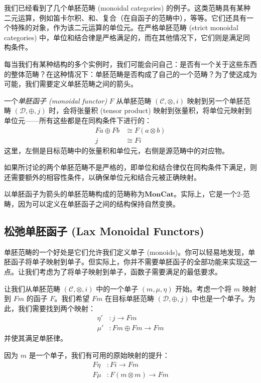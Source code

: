 \documentclass[DaoFP]{subfiles}
\begin{document}
    我们已经看到了几个单胚范畴 (monoidal categories) 的例子。这类范畴具有某种二元运算，例如笛卡尔积、和、复合（在自函子的范畴中），等等。它们还具有一个特殊的对象，作为该二元运算的单位元。在严格单胚范畴 (strict monoidal categories) 中，单位和结合律是严格满足的，而在其他情况下，它们则是满足同构条件。

    每当我们有某种结构的多个实例时，我们可能会问自己：是否有一个关于这些东西的整体范畴？在这种情况下：单胚范畴是否构成了自己的一个范畴？为了使这成为可能，我们需要定义单胚范畴之间的箭头。

    一个\emph{单胚函子 (monoidal functor)} $F$ 从单胚范畴 $(\mathcal{C}, \otimes, i)$ 映射到另一个单胚范畴 $(\mathcal{D}, \oplus, j)$ 时，会将张量积 (tensor product) 映射到张量积，将单位元映射到单位元——所有这些都是在同构条件下进行的：
    \begin{align*}
        F a \oplus F b &\cong F (a \otimes b) \\
        j &\cong F i
    \end{align*}
    这里，左侧是目标范畴中的张量积和单位元，右侧是源范畴中的对应物。

    如果所讨论的两个单胚范畴不是严格的，即单位和结合律仅在同构条件下满足，则还需要额外的相容性条件，以确保单位元和结合元被正确映射。

    以单胚函子为箭头的单胚范畴构成的范畴称为$\mathbf{MonCat}$。实际上，它是一个2-范畴，因为可以定义在单胚函子之间的结构保持自然变换。

    \subsection{松弛单胚函子 (Lax Monoidal Functors)}

    单胚范畴的一个好处是它们允许我们定义单子 (monoids)。你可以轻易地发现，单胚函子将单子映射到单子。但实际上，你并不需要单胚函子的全部功能来实现这一点。让我们考虑为了将单子映射到单子，函数子需要满足的最低要求。

    让我们从单胚范畴 $(\mathcal{C}, \otimes, i)$ 中的一个单子 $(m, \mu, \eta)$ 开始。考虑一个将 $m$ 映射到 $F m$ 的函子 $F$。我们希望 $F m$ 在目标单胚范畴 $(\mathcal{D}, \oplus, j)$ 中也是一个单子。为此，我们需要找到两个映射：
    \begin{align*}
        \eta' &\colon j \to F m \\
        \mu' &\colon F m \oplus F m \to F m
    \end{align*}
    并使其满足单胚律。

    因为 $m$ 是一个单子，我们有可用的原始映射的提升：
    \begin{align*}
        F \eta &\colon F i \to F m \\
        F \mu &\colon F (m \otimes m) \to F m
    \end{align*}
\end{document}
